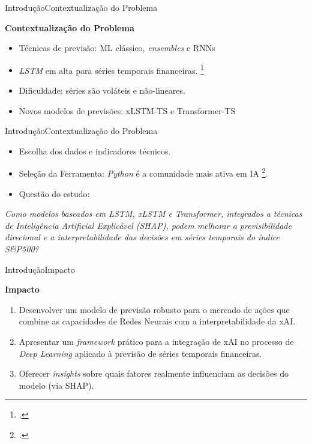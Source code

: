 \documentclass[10pt]{beamer}
\begin{document}
\begin{frame}{Introdução}{Contextualização do Problema}

\Large{\textbf{Contextualização do Problema}}

\small{
\begin{itemize}
    \item Técnicas de previsão: ML clássico, \textit{ensembles} e RNNs
    \item \textit{LSTM} em alta para séries temporais financeiras. \footcite{Nelson2017UsoRedes}
    \item Dificuldade: séries são voláteis e não-lineares.
    \item Novos modelos de previsões: xLSTM-TS e Transformer-TS
\end{itemize}
}
\end{frame}

\begin{frame}{Introdução}{Contextualização do Problema}
\begin{itemize}
    \item Escolha dos dados e indicadores técnicos.
    \item Seleção da Ferramenta: \textit{Python} é a comunidade mais ativa em IA \footcite{site6}.
    \item Questão do estudo:
\end{itemize}

\textit{Como modelos baseados em LSTM, xLSTM e Transformer, integrados a técnicas de Inteligência Artificial Explicável (SHAP), podem melhorar a previsibilidade direcional e a interpretabilidade das decisões em séries temporais do índice S\&P500?}

\end{frame}

\begin{frame}{Introdução}{Impacto}

\Large{\textbf{Impacto}}

\small{
\begin{enumerate}
    \item Desenvolver um modelo de previsão robusto para o mercado de ações que combine as capacidades de Redes Neurais com a interpretabilidade da xAI.
    \item Apresentar um \textit{framework} prático para a integração de xAI no processo de \textit{Deep Learning} aplicado à previsão de séries temporais financeiras.
    \item Oferecer \textit{insights} sobre quais fatores realmente influenciam as decisões do modelo (via SHAP).
\end{enumerate}
}
\end{frame}
\end{document}
